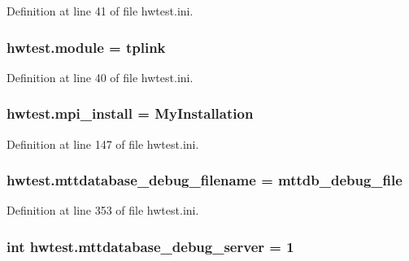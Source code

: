Definition at line 41 of file hwtest.\-ini.

\hypertarget{namespacehwtest_acc1aaeb8f3c26bd3054520cba5b8dfe5}{
\subsubsection[{module}]{\setlength{\rightskip}{0pt plus 5cm}hwtest.\-module = tplink}}\label{namespacehwtest_acc1aaeb8f3c26bd3054520cba5b8dfe5}


Definition at line 40 of file hwtest.\-ini.

\hypertarget{namespacehwtest_a92b45acc8d45d80d6032cba2a6b6dd5e}{
\subsubsection[{mpi\-\_\-install}]{\setlength{\rightskip}{0pt plus 5cm}hwtest.\-mpi\-\_\-install = My\-Installation}}\label{namespacehwtest_a92b45acc8d45d80d6032cba2a6b6dd5e}


Definition at line 147 of file hwtest.\-ini.

\hypertarget{namespacehwtest_aaf511fc503606c1808a06d8da809263e}{
\subsubsection[{mttdatabase\-\_\-debug\-\_\-filename}]{\setlength{\rightskip}{0pt plus 5cm}hwtest.\-mttdatabase\-\_\-debug\-\_\-filename = mttdb\-\_\-debug\-\_\-file}}\label{namespacehwtest_aaf511fc503606c1808a06d8da809263e}


Definition at line 353 of file hwtest.\-ini.

\hypertarget{namespacehwtest_a1da4b943796a82979729d658ea0e913d}{
\subsubsection[{mttdatabase\-\_\-debug\-\_\-server}]{\setlength{\rightskip}{0pt plus 5cm}int hwtest.\-mttdatabase\-\_\-debug\-\_\-server = 1}}\label{namespacehwtest_a1da4b943796a82979729d658ea0e913d}


